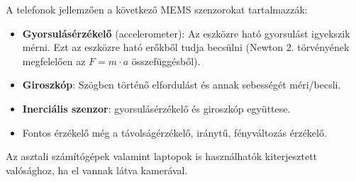 A telefonok jellemzően a következő MEMS szenzorokat tartalmazzák:
\begin{itemize}

\item {\bf Gyorsulásérzékelő} (accelerometer): Az eszközre ható gyorsulást igyekszik mérni. Ezt az eszközre ható erőkből tudja becsülni (Newton 2. törvényének megfelelően az $F = m \cdot a$ összefüggésből).
\item {\bf Giroszkóp}: Szögben történő elfordulást és annak sebességét méri/becsli.
\item {\bf Inerciális szenzor}: gyorsulásérzékelő és giroszkóp együttese.
\item Fontos érzékelő még a távolságérzékelő, iránytű, fényváltozás érzékelő.
\end{itemize}

Az asztali számítógépek valamint laptopok is használhatók kiterjesztett valósághoz, ha el vannak látva kamerával.


